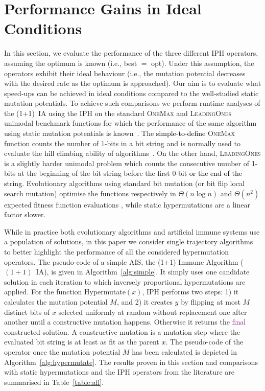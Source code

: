 \documentclass[lettersize,journal]{IEEEtran}
\newcommand{\new}[1]{\textcolor{black}{#1}}
\newcommand{\rerev}[1]{\textcolor{purple}{#1}}
\newcommand{\rev}[1]{\textcolor{black}{#1}}
\newcommand{\oneoneIA}{$(1+1)$~IA}
\newcommand{\IPHfcm}{IPH}
\begin{document}
 	
\section{Performance Gains in Ideal Conditions}\label{sec:OptKnown} 






In this section, we evaluate the performance of the three different \IPHfcm{} operators, assuming the optimum is known (i.e., best $=$ opt). Under this assumption, the operators exhibit their ideal behaviour (i.e., the mutation potential decreases with the desired rate as the optimum is approached).
Our aim is to evaluate what speed-ups can be achieved in ideal conditions compared to the well-studied static mutation potentials. To achieve such comparisons we perform runtime analyses of the (1+1)~IA  using the \IPHfcm{} on the standard \textsc{OneMax} and \textsc{LeadingOnes} unimodal benchmark functions for which the performance of the same algorithm using static mutation potentials is known~\cite{CorusOlivetoYazdani2019TCS}. The \rev{simple-to-define} \textsc{OneMax} function counts the number of 1-bits in \new{a} bit string and is normally used to evaluate the hill climbing ability of algorithms~\cite{LehrTEVC2018,CorusOlivetoTEVCsteadyGA2017,CorusOlivetoAlgo2020,DoerrDoerrEbel2015}. On the other hand, \textsc{LeadingOnes} is a slightly harder unimodal problem which counts the consecutive number of 1-bits at the beginning of the bit string before the first 0-bit \rev{or the end of the string}. 
Evolutionary algorithms using standard bit mutation (or bit flip local search mutation) optimise the functions respectively in $\Theta(n \log n)$ and $\Theta(n^2)$ expected fitness function evaluations \cite{DrosteJansenWegener2002,BoettcherEtAl2010,DoerrEtAl2016B,LissovoiOlivetoWarwicker2020,DLOW2018}, while static hypermutations are a linear factor slower\cite{CorusOlivetoYazdani2019TCS}.

While in practice both evolutionary algorithms and artificial immune systems use a population of solutions, in this paper we consider single trajectory algorithms to better highlight the performance of all the considered hypermutation operators.
The pseudo-code of a simple AIS,  the (1+1) Immune Algorithm (\oneoneIA{}), is given in Algorithm~\ref{alg:simple}. It simply uses one candidate solution in each iteration to which inversely proportional hypermutations are applied. For the function Hypermutate$(x)$, \IPHfcm{} performs two steps: 
1) it calculates the mutation potential $M$, and 2) it creates $y$ by flipping at most $M$ distinct bits of $x$ selected uniformly at random without replacement one after another until a constructive mutation happens. Otherwise it returns the \rerev{final} constructed solution. A  constructive mutation is a mutation step where the evaluated bit string is at least as fit as the parent \new{$x$}. The pseudo-code of the operator once the mutation potential $M$ has been calculated is depicted in Algorithm~\ref{alg:hypermutate}.
The results proven in this section and comparisons with static hypermutations and the IPH operators from the literature are summarised in Table~\ref{table:afl}.
\end{document}
